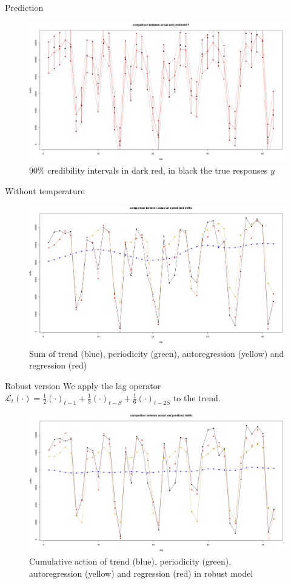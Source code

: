 \documentclass{beamer}
\begin{document}
\begin{frame}{Prediction}
\begin{figure}[H]
	\centering
	\includegraphics[width=100 mm]{pictures/m2_g2.png}
	\caption{90\% \alert{credibility intervals} in dark red, in black the true responses $ y $}
	\label{fig:M2_p2}
\end{figure}
\end{frame}

\begin{frame}{Without temperature}
\begin{figure}[H]
		\centering
	\includegraphics[width=100 mm]{pictures/m3_p1.png}
	\caption{Sum of trend (blue), periodicity (green), autoregression (yellow) and regression (red)}
	\label{fig:M3_p1}
\end{figure}
\end{frame}

\begin{frame}{Robust version}
We apply the \alert{lag operator} $\mathcal{L}_t(\cdot) = \frac{1}{2}(\cdot)_{t-1} + \frac{1}{3}(\cdot)_{t-S} +\frac{1}{6}(\cdot)_{t-2S}$ to the trend.

\begin{figure}[H]
	\centering
\includegraphics[width=100 mm]{pictures/m4_p1.png}
\caption{\tiny Cumulative action of trend (blue), periodicity (green), autoregression (yellow) and regression (red) in robust model}
\label{fig:M4_p1}
\end{figure}
\end{frame}
\end{document}
